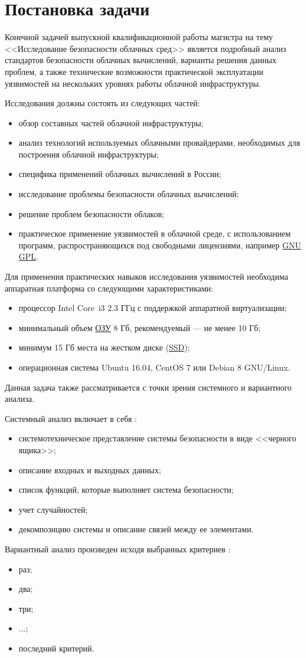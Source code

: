 \section{Постановка задачи}

Конечной задачей выпускной квалификационной работы магистра на тему <<Исследование безопасности облачных сред>> является подробный анализ стандартов безопасности облачных вычислений, варианты решения данных проблем, а также технические возможности практической эксплуатации уязвимостей на нескольких уровнях работы облачной инфраструктуры.

Исследования должны состоять из следующих частей:
\begin{itemize}
  \item обзор составных частей облачной инфраструктуры;
  \item анализ технологий используемых облачными провайдерами, необходимых для построения облачной инфраструктуры;
  \item специфика применений облачных вычислений в России;
  \item исследование проблемы безопасности облачных вычислений;
  \item решение проблем безопасности облаков;
  \item практическое применение уязвимостей в облачной среде, с использованием программ, распространяющихся под свободными лицензиями, например \hyperlink{gnu}{GNU} \hyperlink{gpl}{GPL}.
\end{itemize}

Для применения практических навыков исследования уязвимостей необходима аппаратная платформа со следующими характеристиками:
\begin{itemize}
  \item процессор Intel Core\textregistered~i3 2.3 ГГц с поддержкой аппаратной виртуализации;
  \item минимальный объем \hyperlink{ram}{ОЗУ} 8 Гб, рекомендуемый --- не менее 10 Гб;
  \item минимум 15 Гб места на жестком диске (\hyperlink{ssd}{SSD});
  \item операционная система Ubuntu 16.04, CentOS 7 или Debian 8 GNU/Linux.
\end{itemize}

Данная задача также рассматривается с точки зрения системного и вариантного анализа.

Системный анализ включает в себя \cite{sys-analyz}:
\begin{itemize}
  \item системотехническое представление системы безопасности в виде <<черного ящика>>;
  \item описание входных и выходных данных;
  \item список функций, которые выполняет система безопасности;
  \item учет случайностей;
  \item декомпозицию системы и описание связей между ее элементами.
\end{itemize}

Вариантный анализ произведен исходя выбранных критериев \cite{var-analyz}:
\begin{itemize}
  \item раз;
  \item два;
  \item три;
  \item ...;
  \item последний критерий.
\end{itemize}

\clearpage
